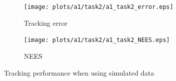 \begin{figure}
    \centering
    \hspace*{-2cm}\begin{adjustbox}{minipage=\linewidth, scale=1.3}
        \begin{subfigure}{.5\textwidth}
            \texttt{[image: plots/a1/task2/a1\_task2\_error.eps]} 
            \caption{Tracking error}
            \label{fig:task22_tracking_error}
        \end{subfigure}
        \begin{subfigure}{.5\textwidth}
            \texttt{[image: plots/a1/task2/a1\_task2\_NEES.eps]} 
            \caption{NEES}
            \label{fig:task22_NEES}
        \end{subfigure}
    \end{adjustbox}
        \caption{Tracking performance when using simulated data}
\end{figure}